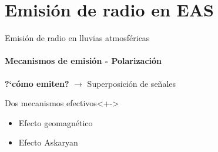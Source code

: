 \section[Emisi\'on]{Emisi\'on de radio en EAS}

\begin{frame}{Emisi\'on de radio en lluvias atmosf\'ericas}
\framesubtitle{Mecanismos de emisi\'on - Polarizaci\'on}
\footnotesize
	
	\begin{alertblock}{}
	\centering
	\textbf{?`c\'omo emiten? }$\rightarrow$ Superposici\'on de se\~nales
	\end{alertblock}
	
	\begin{exampleblock}{Dos mecanismos efectivos}<+->
		\begin{itemize}[<alert@+|+->]
		 \item Efecto geomagn\'etico
		 \item Efecto Askaryan
		\end{itemize}
	\end{exampleblock}
	\vfill
	\begin{overprint}
		\centerline{}
		\centerline{}
	\end{overprint}
\end{frame}

% 		

